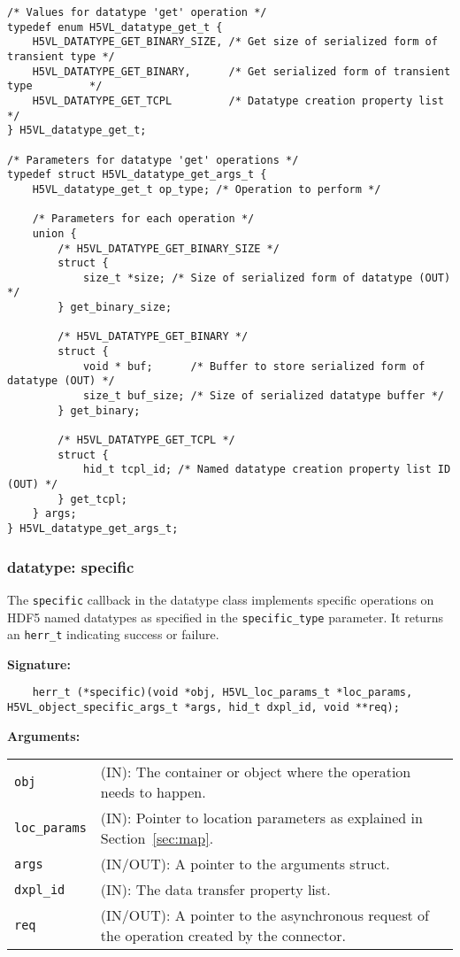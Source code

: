\begin{lstlisting}
/* Values for datatype 'get' operation */
typedef enum H5VL_datatype_get_t {
    H5VL_DATATYPE_GET_BINARY_SIZE, /* Get size of serialized form of transient type */
    H5VL_DATATYPE_GET_BINARY,      /* Get serialized form of transient type         */
    H5VL_DATATYPE_GET_TCPL         /* Datatype creation property list               */
} H5VL_datatype_get_t;

/* Parameters for datatype 'get' operations */
typedef struct H5VL_datatype_get_args_t {
    H5VL_datatype_get_t op_type; /* Operation to perform */

    /* Parameters for each operation */
    union {
        /* H5VL_DATATYPE_GET_BINARY_SIZE */
        struct {
            size_t *size; /* Size of serialized form of datatype (OUT) */
        } get_binary_size;

        /* H5VL_DATATYPE_GET_BINARY */
        struct {
            void * buf;      /* Buffer to store serialized form of datatype (OUT) */
            size_t buf_size; /* Size of serialized datatype buffer */
        } get_binary;

        /* H5VL_DATATYPE_GET_TCPL */
        struct {
            hid_t tcpl_id; /* Named datatype creation property list ID (OUT) */
        } get_tcpl;
    } args;
} H5VL_datatype_get_args_t;
\end{lstlisting}

\subsubsection{datatype: specific}
The \texttt{specific} callback in the datatype class implements specific operations on HDF5 named datatypes as specified in the \texttt{specific\_type} parameter. It returns an \texttt{herr\_t} indicating success or failure.\bigskip

\begin{mdframed}[style=bgbox]
\textbf{Signature:}
\begin{lstlisting}
	herr_t (*specific)(void *obj, H5VL_loc_params_t *loc_params, H5VL_object_specific_args_t *args, hid_t dxpl_id, void **req);
\end{lstlisting}

\textbf{Arguments:}\\
\begin{tabular}{l p{13.5cm}}
  \texttt{obj} & (IN): The container or object where the operation needs to happen.\\
  \texttt{loc\_params} & (IN): Pointer to location parameters as explained in Section~\ref{sec:map}.\\
  \texttt{args} & (IN/OUT): A pointer to the arguments struct.\\
  \texttt{dxpl\_id} & (IN): The data transfer property list.\\
  \texttt{req} & (IN/OUT): A pointer to the asynchronous request of the
  operation created by the connector.\\
\end{tabular}
\end{mdframed}

